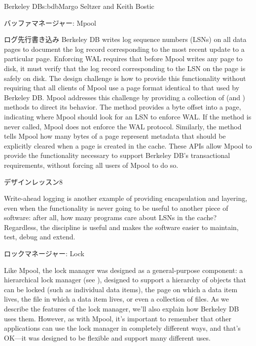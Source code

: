\begin{aosachapter}{Berkeley DB}{s:bdb}{Margo Seltzer and Keith Bostic}
\begin{aosasect1}{バッファマネージャー: Mpool}
\begin{aosasect2}{ログ先行書き込み}
Berkeley DB writes log sequence numbers (LSNs) on all data pages to
document the log record corresponding to the most recent update to a
particular page.  Enforcing WAL requires that before Mpool writes any
page to disk, it must verify that the log record corresponding to the
LSN on the page is safely on disk.  The design challenge is how to
provide this functionality without requiring that all clients of Mpool
use a page format identical to that used by Berkeley DB\@. Mpool
addresses this challenge by providing a collection of  (and
) methods to direct its behavior.  The  method
 provides a byte offset into a page, indicating
where Mpool should look for an LSN to enforce WAL\@.  If the method is
never called, Mpool does not enforce the WAL protocol. Similarly, the
 method tells Mpool how many bytes of a page
represent metadata that should be explicitly cleared when a page is
created in the cache. These APIs allow Mpool to provide the
functionality necessary to support Berkeley DB's transactional
requirements, without forcing all users of Mpool to do so. 

\begin{aosabox}{デザインレッスン8}

Write-ahead logging is another example of providing encapsulation and
layering, even when the functionality is never going to be useful to
another piece of software: after all, how many programs care about
LSNs in the cache?  Regardless, the discipline is useful and makes the
software easier to maintain, test, debug and extend.

\end{aosabox}

\end{aosasect2}

\end{aosasect1}

\begin{aosasect1}{ロックマネージャー: Lock}


Like Mpool, the lock manager was designed as a general-purpose
component: a hierarchical lock manager (see \cite{bib:gray:lock}),
designed to support a hierarchy of objects that can be locked (such as
individual data items), the page on which a data item lives, the file
in which a data item lives, or even a collection of files. As we
describe the features of the lock manager, we'll also explain how
Berkeley DB uses them.  However, as with Mpool, it's important to
remember that other applications can use the lock manager in
completely different ways, and that's OK---it was designed to be
flexible and support many different uses.


\end{aosasect1}
\end{aosachapter}
